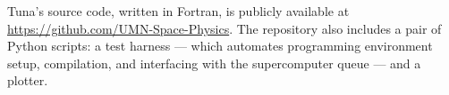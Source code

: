 Tuna's source code, written in Fortran, is publicly available at
\url{https://github.com/UMN-Space-Physics}. The repository also includes a pair
of Python scripts: a test harness --- which automates programming environment
setup, compilation, and interfacing with the supercomputer queue --- and a
plotter. 







